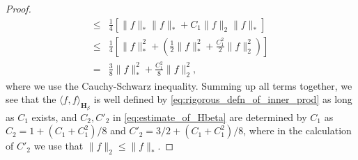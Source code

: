 \documentclass[11pt, a4paper]{article}
\numberwithin{equation}{section}
\newcommand{\Hbeta}{\mathbf{H}_{\beta}}
\theoremstyle{definition}
\theoremstyle{remark}
\begin{document}
\begin{proof}
\begin{equation}
\begin{split}
      \leq {}& \frac{1}{4} [\lVert f \rVert_* \lVert f \rVert_* + C_1 \lVert f \rVert_2 \lVert f \rVert_* ] \\
      \leq {}& \frac{1}{4} \left[ \lVert f \rVert^2_* + \left( \frac{1}{2} \lVert f \rVert^2_* + \frac{C^2_1}{2} \lVert f \rVert^2_2 \right) \right] \\
      = {}& \frac{3}{8} \lVert f \rVert^2_* + \frac{C^2_1}{8} \lVert f \rVert^2_2,
    \end{split}
  \end{equation}
  where we use the Cauchy-Schwarz inequality. Summing up all terms together, we see that the $\langle f, f \rangle_{\Hbeta}$ is well defined by \eqref{eq:rigorous_defn_of_inner_prod} as long as $C_1$ exists, and $C_2, C'_2$ in \eqref{eq:estimate_of_Hbeta} are determined by $C_1$ as $C_2 = 1 + (C_1 + C^2_1)/8$ and $C'_2 = 3/2 + (C_1 + C^2_1)/8$, where in the calculation of $C'_2$ we use that $\lVert f \rVert_2 \leq \lVert f \rVert_*$.
\end{proof}
\end{document}
